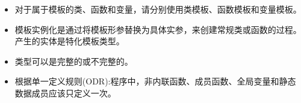 
\begin{itemize}
\item 
对于属于模板的类、函数和变量，请分别使用类模板、函数模板和变量模板。

\item 
模板实例化是通过将模板形参替换为具体实参，来创建常规类或函数的过程。产生的实体是特化模板类型。

\item 
类型可以是完整的或不完整的。

\item 
根据单一定义规则(ODR):程序中，非内联函数、成员函数、全局变量和静态数据成员应该只定义一次。
\end{itemize}
